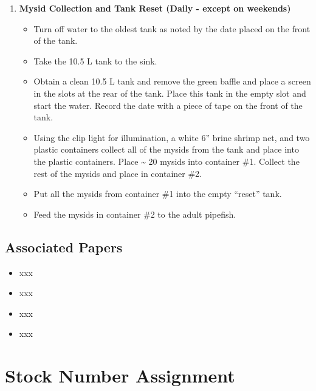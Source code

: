 \documentclass[
  letterpaper,
  DIV=11,
  numbers=noendperiod]{scrreprt}
\providecommand{\tightlist}{%
  \setlength{\itemsep}{0pt}\setlength{\parskip}{0pt}}\usepackage{longtable,booktabs,array}
\begin{document}
\begin{enumerate}
\def\labelenumi{\arabic{enumi}.}
\setcounter{enumi}{2}
\tightlist
\item
  \textbf{Mysid Collection and Tank Reset (Daily - except on weekends)}

  \begin{itemize}
  \tightlist
  \item
    Turn off water to the oldest tank as noted by the date placed on the
    front of the tank.
  \item
    Take the 10.5 L tank to the sink.
  \item
    Obtain a clean 10.5 L tank and remove the green baffle and place a
    screen in the slots at the rear of the tank. Place this tank in the
    empty slot and start the water. Record the date with a piece of tape
    on the front of the tank.
  \item
    Using the clip light for illumination, a white 6'' brine shrimp net,
    and two plastic containers collect all of the mysids from the tank
    and place into the plastic containers. Place \textasciitilde{} 20
    mysids into container \#1. Collect the rest of the mysids and place
    in container \#2.
  \item
    Put all the mysids from container \#1 into the empty ``reset'' tank.
  \item
    Feed the mysids in container \#2 to the adult pipefish.
  \end{itemize}
\end{enumerate}

\hypertarget{associated-papers-8}{%
\section{Associated Papers}\label{associated-papers-8}}

\begin{itemize}
\tightlist
\item
  xxx
\item
  xxx
\item
  xxx
\item
  xxx
\end{itemize}

\hypertarget{sec-Husbandry-Stickleback_database_use}{%
\chapter{Stock Number
Assignment}\label{sec-Husbandry-Stickleback_database_use}}
\end{document}
